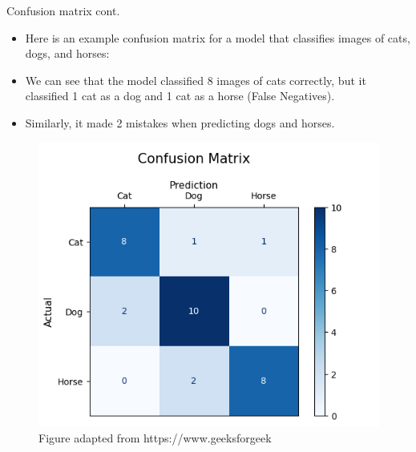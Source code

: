 \documentclass[serif, aspectratio=169]{beamer}
\begin{document}
\begin{frame}{Confusion matrix cont.}
    \begin{minipage}{0.4\textwidth}
        \begin{itemize}
            \item Here is an example confusion matrix for a model that classifies images of cats, dogs, and horses:
            \item We can see that the model classified 8 images of cats correctly, but it classified 1 cat as a dog and 1 cat as a horse (False Negatives).
            \item Similarly, it made 2 mistakes when predicting dogs and horses.
        \end{itemize}
    \end{minipage}
    \hfill
    \begin{minipage}{0.55\textwidth}
        \begin{figure}[h]
            \centering
            \includegraphics[width=1\textwidth]{pic/cmCatDogHorse.png}
            \caption* {\scriptsize Figure adapted from https://www.geeksforgeek}
        \end{figure}
    \end{minipage}
\end{frame}


            
\end{document}
